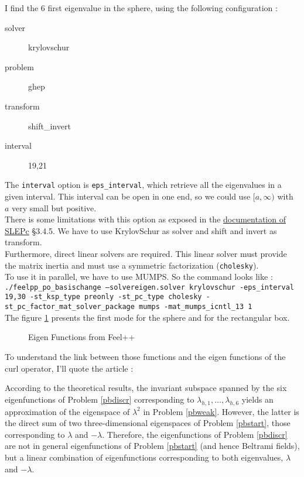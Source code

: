 I find the 6 first eigenvalue in the sphere, using the following configuration :
\begin{description}
\item[solver] krylovschur
\item[problem] ghep
\item[transform] shift\_invert
\item[interval] 19,21
\end{description}

The \texttt{interval}  option is \texttt{eps\_interval}, which retrieve all the eigenvalues in a given interval. This interval can be open in one end, so we could use $[a, \infty)$ with $a$ very small but positive.\\
There is some limitations with this option as exposed in the \href{http://slepc.upv.es/documentation/slepc.pdf}{documentation of SLEPc} \S 3.4.5. We have to use KrylovSchur as solver and shift and invert as transform.\\
Furthermore, direct linear solvers are required. This linear solver must provide the matrix inertia and must use a symmetric factorization (\texttt{cholesky}).\\

To use it in parallel, we have to use MUMPS. So the command looks like :\\
\texttt{./feelpp\_po\_basischange --solvereigen.solver krylovschur -eps\_interval 19,30 -st\_ksp\_type preonly -st\_pc\_type cholesky -st\_pc\_factor\_mat\_solver\_package mumps -mat\_mumps\_icntl\_13 1}\\
The figure \ref{feelModes} presents the first mode for the sphere and for the rectangular box.
\begin{figure}[H]
  \caption{Eigen Functions from Feel++}
  \label{feelModes}
\end{figure}

To understand the link between those functions and the eigen functions of the curl operator, I'll quote the article \cite{Venegas2013} :
\begin{italicquotes}
  According to the theoretical results, the invariant subspace spanned by the six eigenfunctions of Problem \ref{pbdiscr} corresponding to $\lambda_{h,1},\dots,\lambda_{h,6}$ yields an approximation of the eigenspace of $\lambda^2$ in Problem \ref{pbweak}. However, the latter is the direct sum of two three-dimensional eigenspaces of Problem \ref{pbstart}, those corresponding to $\lambda$ and $-\lambda$. Therefore, the eigenfunctions of Problem \ref{pbdiscr} are not in general eigenfunctions of Problem \ref{pbstart} (and hence Beltrami fields), but a linear combination of eigenfunctions corresponding to both eigenvalues, $\lambda$ and $-\lambda$.
\end{italicquotes}


